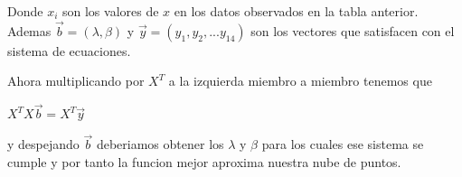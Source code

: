 \documentclass{article}
\begin{document}
Donde \(x_i\) son los valores de \(x\) en los datos observados en la tabla anterior. Ademas $\vec{b} = (\lambda,\beta)$ y 
$\vec{y} = (y_1,y_2,...y_14)$ son los vectores que satisfacen con el sistema de ecuaciones.

Ahora multiplicando por $X^T$ a la izquierda miembro a miembro tenemos que 

\begin{center}
    $X^TX \vec{b} = X^T \vec{y}$
\end{center}

y despejando $\vec{b}$ deberiamos obtener los $\lambda$ y $\beta$ para los cuales ese sistema se cumple y por tanto
la funcion mejor aproxima nuestra nube de puntos.
\end{document}
